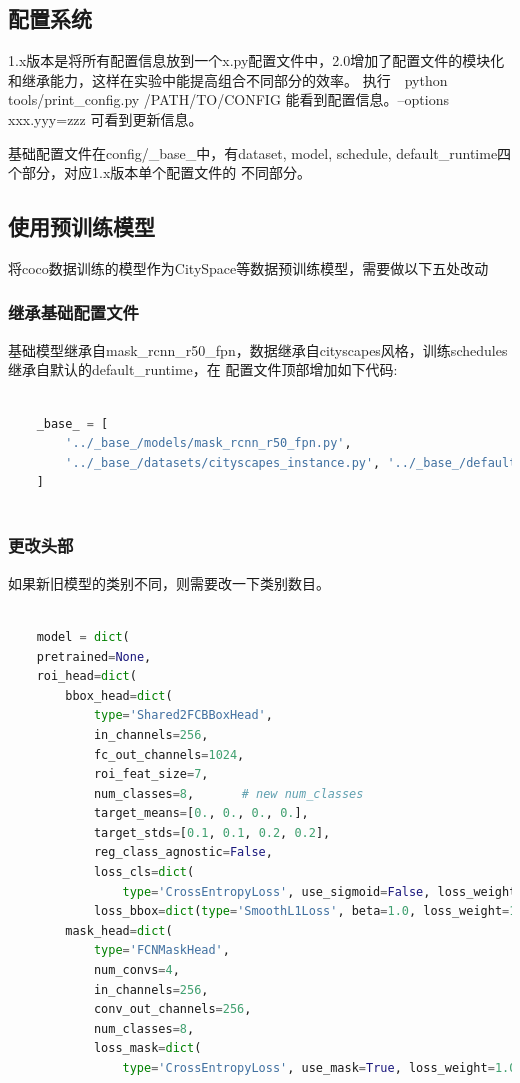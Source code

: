\documentclass[UTF8]{ctexart}
\begin{document}
\subsection{配置系统}
1.x版本是将所有配置信息放到一个x.py配置文件中，2.0增加了配置文件的模块化和继承能力，这样在实验中能提高组合不同部分的效率。
执行　python tools/print\_config.py /PATH/TO/CONFIG 能看到配置信息。--options xxx.yyy=zzz  可看到更新信息。

基础配置文件在config/\_base\_中，有dataset, model, schedule, default\_runtime四个部分，对应1.x版本单个配置文件的
不同部分。


\subsection{使用预训练模型}
将coco数据训练的模型作为CitySpace等数据预训练模型，需要做以下五处改动

\subsubsection{继承基础配置文件}
基础模型继承自mask\_rcnn\_r50\_fpn，数据继承自cityscapes风格，训练schedules继承自默认的default\_runtime，在
配置文件顶部增加如下代码:

\lstset{style=mystyle}
\begin{lstlisting}[language=Python]

	_base_ = [
		'../_base_/models/mask_rcnn_r50_fpn.py',
		'../_base_/datasets/cityscapes_instance.py', '../_base_/default_runtime.py'
	]
	
\end{lstlisting}

\subsubsection{更改头部}
如果新旧模型的类别不同，则需要改一下类别数目。

\lstset{style=mystyle}
\begin{lstlisting}[language=Python]

	model = dict(
    pretrained=None,
    roi_head=dict(
        bbox_head=dict(
            type='Shared2FCBBoxHead',
            in_channels=256,
            fc_out_channels=1024,
            roi_feat_size=7,
            num_classes=8,　　　　# new num_classes
            target_means=[0., 0., 0., 0.],
            target_stds=[0.1, 0.1, 0.2, 0.2],
            reg_class_agnostic=False,
            loss_cls=dict(
                type='CrossEntropyLoss', use_sigmoid=False, loss_weight=1.0),
            loss_bbox=dict(type='SmoothL1Loss', beta=1.0, loss_weight=1.0)),
        mask_head=dict(
            type='FCNMaskHead',
            num_convs=4,
            in_channels=256,
            conv_out_channels=256,
            num_classes=8,
            loss_mask=dict(
                type='CrossEntropyLoss', use_mask=True, loss_weight=1.0)))
	
\end{lstlisting}
\end{document}
